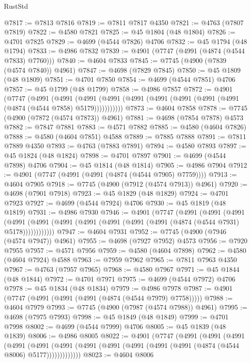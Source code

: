 \begin{lexlean}{RustStd}
\begin{coremodule}
@7817 := @7813 @7816
@7819 := @7811 @7817 @4350
@7821 := @4763 (@7807 @7819)
@7822 := @4580 @7821
@7825 := @45 @1804 (@48 @1804)
@7826 := @4701 @7825
@7829 := @4699 (@4544 @7826) @4706
@7832 := @45 @1794 (@48 @1794)
@7833 := @4986 @7832
@7839 := @4901 (@7747 (@4991 (@4874 (@4544 @7833) @7760)))
@7840 := @4604 @7833
@7845 := @7745 (@4900 (@7839 (@4574 @7840)) @4961)
@7847 := @4698 (@7829 @7845)
@7850 := @45 @1809 (@48 @1809)
@7851 := @4701 @7850
@7854 := @4699 (@4544 @7851) @4706
@7857 := @45 @1799 (@48 @1799)
@7858 := @4986 @7857
@7872 := @4901
    (@7747
      (@4991
        (@4991
          (@4991 (@4991 (@4991 (@4991 (@4991 (@4991 (@4991 (@4874 (@4544 @7858) @5179)))))))))))
@7873 := @4604 @7858
@7878 := @7745 (@4900 (@7872 (@4574 @7873)) @4961)
@7881 := @4698 (@7854 @7878) @4573
@7882 := @7847 @7881
@7883 := @4571 @7882
@7885 := @4580 (@4604 @7826)
@7888 := @4580 (@4604 @7851) @4588
@7889 := @7885 @7888
@7891 := @7811 @7889 @4350
@7893 := @4763 (@7883 @7891)
@7894 := @4580 @7893
@7897 := @45 @1824 (@48 @1824)
@7898 := @4701 @7897
@7901 := @4699 (@4544 @7898) @4706
@7904 := @45 @1814 (@48 @1814)
@7905 := @4986 @7904
@7912 := @4901 (@7747 (@4991 (@4991 (@4874 (@4544 @7905) @7759))))
@7913 := @4604 @7905
@7918 := @7745 (@4900 (@7912 (@4574 @7913)) @4961)
@7920 := @4698 (@7901 @7918)
@7923 := @45 @1829 (@48 @1829)
@7924 := @4701 @7923
@7927 := @4699 (@4544 @7924) @4706
@7930 := @45 @1819 (@48 @1819)
@7931 := @4986 @7930
@7946 := @4901
    (@7747
      (@4991
        (@4991
          (@4991
            (@4991 (@4991 (@4991 (@4991 (@4991 (@4991 (@4991 (@4874 (@4544 @7931) @5178))))))))))))
@7947 := @4604 @7931
@7952 := @7745 (@4900 (@7946 (@4574 @7947)) @4961)
@7955 := @4698 (@7927 @7952) @4573
@7956 := @7920 @7955
@7957 := @4571 @7956
@7959 := @4580 (@4604 @7898)
@7962 := @4580 (@4604 @7924) @4588
@7963 := @7959 @7962
@7965 := @7811 @7963 @4350
@7967 := @4763 (@7957 @7965)
@7968 := @4580 @7967
@7971 := @45 @1844 (@48 @1844)
@7972 := @4701 @7971
@7975 := @4699 (@4544 @7972) @4706
@7978 := @45 @1834 (@48 @1834)
@7979 := @4986 @7978
@7987 := @4901 (@7747 (@4991 (@4991 (@4991 (@4874 (@4544 @7979) @7758)))))
@7988 := @4604 @7979
@7993 := @7745 (@4900 (@7987 (@4574 @7988)) @4961)
@7995 := @4698 (@7975 @7993)
@7998 := @45 @1849 (@48 @1849)
@7999 := @4701 @7998
@8002 := @4699 (@4544 @7999) @4706
@8005 := @45 @1839 (@48 @1839)
@8006 := @4986 @8005
@8022 := @4901
    (@7747
      (@4991
        (@4991
          (@4991
            (@4991
              (@4991
                (@4991 (@4991 (@4991 (@4991 (@4991 (@4991 (@4874 (@4544 @8006) @5177)))))))))))))
@8023 := @4604 @8006

\end{coremodule}
\end{lexlean}
